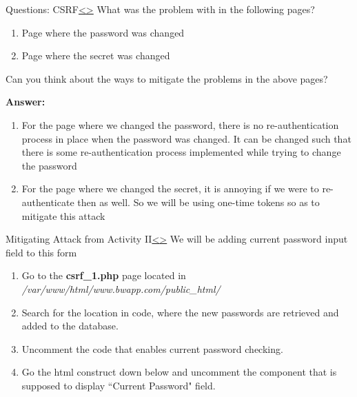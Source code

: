 \documentclass[12pt]{extarticle}
\newenvironment{instructionblock}{\Large\bgroup}{\egroup}
\begin{document}


\pagebreak
\begin{slide}{Questions: CSRF}{\hyperref[slide 17]{\textless}\hyperref[slide 19]{\textgreater}}
	\begin{instructionblock}
		What was the problem with in the following pages? 
		\begin{enumerate}
			\item Page where the password was changed
			\item Page where the secret was changed
		\end{enumerate}
		Can you think about the ways to mitigate the problems in the above pages?
	\end{instructionblock}	
\end{slide}

\vspace{2mm}
\noindent
\vfill
\textbf{Answer:}\\
\begin{enumerate}
	\item For the page where we changed the password, there is no re-authentication process in place when the password was changed. It can be changed such that there is some re-authentication process implemented while trying to change the password 
	\item For the page where we changed the secret, it is annoying if we were to re-authenticate then as well. So we will be using one-time tokens so as to mitigate this attack  
\end{enumerate}




\pagebreak
\begin{slide}{Mitigating Attack from Activity II}{\hyperref[slide 18]{\textless}\hyperref[slide 20]{\textgreater}}
	\begin{instructionblock}
		We will be adding current password input field to this form
		\begin{enumerate}
			\item Go to the \textbf{csrf\_1.php} page located in \textit{/var/www/html/www.bwapp.com/public\_html/}
			\item Search for the location in code, where the new passwords are retrieved and added to the database.
			\item Uncomment the code that enables current password checking.
			\item Go the html construct down below and uncomment the component that is supposed to display ``Current Password" field. 
		\end{enumerate}
	\end{instructionblock}	
\end{slide}
\end{document}
